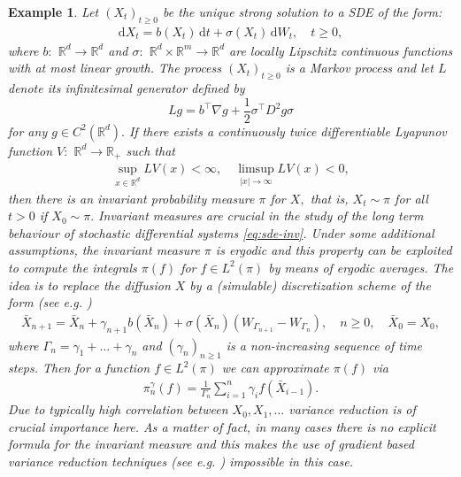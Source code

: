 \documentclass[bj]{imsart}
\def\rmd{\mathrm{d}}
\newtheorem{example}[thm]{Example}
\begin{document}
\begin{example}
  Let \((X_t)_{t\geq 0}\) be the unique strong solution to a  SDE of the form:
\begin{eqnarray}
\label{eq:sde-inv}
\rmd X_t=b(X_t)\, \rmd t+\sigma(X_t)\, \rmd W_t,\quad t\geq 0,	
\end{eqnarray}
where \(b:\) \(\mathbb{R}^d\to \mathbb{R}^d\) and \(\sigma:\) \(\mathbb{R}^d\times \mathbb{R}^m \to \mathbb{R}^d\) are locally Lipschitz continuous functions with at most linear growth.
The process \((X_t)_{t\geq 0}\) is a Markov
process and let \(L\) denote its infinitesimal generator defined by
\begin{equation*}
Lg=b^\top \nabla g+\frac{1}{2}\sigma^\top D^2g\sigma
\end{equation*}
for any \(g\in C^2(\mathbb{R}^d).\)
If there exists a continuously twice differentiable Lyapunov function \(V:\) \(\mathbb{R}^d\to \mathbb{R}_{+}\) such that
\begin{eqnarray*}
\sup_{x\in \mathbb{R}^d} LV(x) <\infty,\quad \limsup_{|x|\to \infty} LV(x)<0,
\end{eqnarray*}
then there is an invariant probability measure \(\pi\)  for \(X,\) that is, \(X_t\sim \pi\) for all \(t> 0\) if \(X_0\sim \pi.\) Invariant measures are crucial in the study of the long term behaviour of stochastic differential
systems \eqref{eq:sde-inv}.    Under some additional assumptions,  the invariant
measure \(\pi\) is  ergodic and this property
can be exploited  to compute  the integrals \(\pi(f)\) for \(f\in L^2(\pi)\) by means of ergodic averages. The idea is to replace the diffusion \(X\) by a (simulable) discretization scheme of the form (see e.g. \cite{MR3861816})
\begin{eqnarray*}
\bar X_{n+1}=\bar X_n+\gamma_{n+1} b(\bar X_n)+\sigma(\bar X_n)(W_{\Gamma_{n+1}}-W_{\Gamma_n}), \quad n\geq 0,\quad \bar X_0=X_0,
\end{eqnarray*}
where \(\Gamma_n=\gamma_1+\ldots+\gamma_n\) and \((\gamma_n)_{n\geq 1}\) is a non-increasing sequence of time steps. Then for a function \(f\in L^2(\pi)\) we can approximate \(\pi(f)\) via
\begin{eqnarray*}
\pi_n^\gamma(f)=\frac{1}{\Gamma_n}\sum_{i=1}^n \gamma_{i}f(\bar X_{i-1}).
\end{eqnarray*}
Due to typically high correlation between \(X_0,X_1,\ldots\)  variance reduction is of crucial importance here.
As a matter of fact, in many cases there is no explicit formula for the invariant measure and this makes the use of gradient  based  variance reduction techniques (see e.g. \cite{mira2013zero}) impossible in this case.
\end{example}
\end{document}
